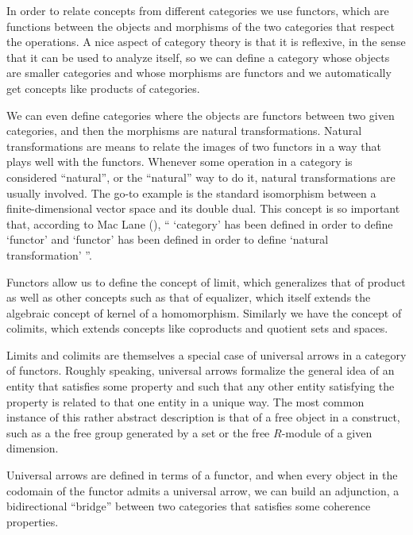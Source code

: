 In order to relate concepts from different categories we use functors, which are
functions between the objects and morphisms of the two categories that respect
the operations. A nice aspect of category theory is that it is reflexive, in the
sense that it can be used to analyze itself, so we can define a category whose
objects are smaller categories and whose morphisms are functors and we
automatically get concepts like products of categories.

We can even define categories where the objects are functors between two given
categories, and then the morphisms are natural transformations. Natural
transformations are means to relate the images of two functors in a way that
plays well with the functors. Whenever some operation in a category is
considered ``natural'', or the ``natural'' way to do it, natural transformations
are usually involved. The go-to example is the standard isomorphism between a
finite-dimensional vector space and its double dual. This concept is so
important that, according to Mac Lane (\cite[p. 18]{maclane}), `` `category' has
been defined in order to define `functor' and `functor' has been defined in
order to define `natural transformation' ''.

Functors allow us to define the concept of limit, which generalizes that of
product as well as other concepts such as that of equalizer, which itself
extends the algebraic concept of kernel of a homomorphism. Similarly we have the
concept of colimits, which extends concepts like coproducts and quotient sets
and spaces.

Limits and colimits are themselves a special case of universal arrows in a
category of functors. Roughly speaking, universal arrows formalize the general
idea of an entity that satisfies some property and such that any other entity
satisfying the property is related to that one entity in a unique way. The most
common instance of this rather abstract description is that of a free object in
a construct, such as a the free group generated by a set or the free $R$-module
of a given dimension.

Universal arrows are defined in terms of a functor, and when every object in the
codomain of the functor admits a universal arrow, we can build an adjunction, a
bidirectional ``bridge'' between two categories that satisfies some coherence
properties.

